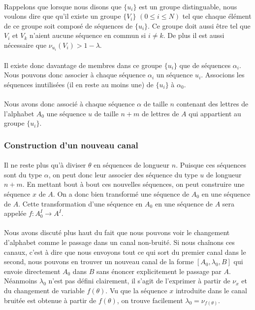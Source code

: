 	\paragraph{}
	Rappelons que lorsque nous disons que $\{u_i\}$ est un groupe distinguable, nous voulons dire que qu'il existe un groupe $\{V_i\}$ $(0 \le i \le N)$ 
	tel que chaque élément de ce groupe soit composé de séquences de $\{u_i\}$. Ce groupe doit aussi être tel que $ V_i$ et $V_k$ n'aient aucune séquence
	en commun si $i\neq k$. De plus il est aussi nécessaire que $\nu_{u_i}(V_i) > 1-\lambda$. 
	
	\paragraph{}
	Il existe donc davantage de membres dans ce groupe $\{u_i\}$ que de séquences $\alpha_i$. Nous pouvons donc associer à chaque séquence $\alpha_i$
	un séquence $u_i$. Associons les séquences inutilisées (il en reste au moins une) de $\{u_i\}$ à $\alpha_0$.
	
	\paragraph{}
	Nous avons donc associé à chaque séquence $\alpha$ de taille $n$ contenant des lettres de l'alphabet $A_0$ une séquence $u$ de taille $n+m$ de
	lettres de $A$ qui appartient au groupe $\{u_i\}$. 
	
\subsubsection*{Construction d'un nouveau canal}
	
	\paragraph{}
	Il ne reste plus qu'à diviser $\theta$ en séquences de longueur $n$. Puisque ces séquences sont du type $\alpha$, on peut donc leur 
	associer des séquence du type $u$ de longueur $n+m$. En mettant bout à bout ces nouvelles séquences, on peut construire une séquence $x$ de $A$. On a donc bien transformé
	une séquence de $A_0$ en une séquence de $A$. Cette transformation d'une séquence en $A_0$ en une séquence de $A$ sera appelée $f : A_0^I \to A^I$.
	
	\paragraph{}
	Nous avons discuté plus haut du fait que nous pouvons voir le changement d'alphabet comme le passage dans un canal non-bruité. 
	Si nous chaînons ces canaux, c'est à dire que nous envoyons tout ce qui sort du premier canal dans le second,
	nous pouvons en trouver un nouveau canal de la forme $[A_0,\lambda_0,B]$ qui envoie directement $A_0$ dans $B$ 
	sans énoncer explicitement le passage par $A$. Néanmoins $\lambda_0$ n'est pas défini clairement, il s'agit de l'exprimer à partir de $\nu_x$ et
	du changement de variable $f(\theta)$. 
	Vu que la séquence $x$ introduite dans le canal bruitée est obtenue à partir de $f(\theta)$, on trouve facilement $\lambda_0=\nu_{f(\theta)}$.
	

